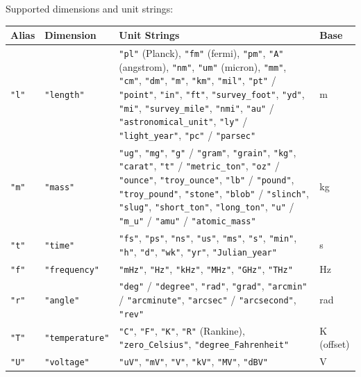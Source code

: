 Supported dimensions and unit strings:

\begin{table}[h]
\centering
\footnotesize
\begin{tabular}{|l|l|p{10cm}|l|}
\hline
\textbf{Alias} & \textbf{Dimension} & \textbf{Unit Strings} & \textbf{Base} \\
\hline
\texttt{"l"} & \texttt{"length"} & \texttt{"pl"} (Planck), \texttt{"fm"} (fermi), \texttt{"pm"}, \texttt{"A"} (angstrom), \texttt{"nm"}, \texttt{"um"} (micron), \texttt{"mm"}, \texttt{"cm"}, \texttt{"dm"}, \texttt{"m"}, \texttt{"km"}, \texttt{"mil"}, \texttt{"pt"} / \texttt{"point"}, \texttt{"in"}, \texttt{"ft"}, \texttt{"survey\_foot"}, \texttt{"yd"}, \texttt{"mi"}, \texttt{"survey\_mile"}, \texttt{"nmi"}, \texttt{"au"} / \texttt{"astronomical\_unit"}, \texttt{"ly"} / \texttt{"light\_year"}, \texttt{"pc"} / \texttt{"parsec"} & m \\
\hline
\texttt{"m"} & \texttt{"mass"} & \texttt{"ug"}, \texttt{"mg"}, \texttt{"g"} / \texttt{"gram"}, \texttt{"grain"}, \texttt{"kg"}, \texttt{"carat"}, \texttt{"t"} / \texttt{"metric\_ton"}, \texttt{"oz"} / \texttt{"ounce"}, \texttt{"troy\_ounce"}, \texttt{"lb"} / \texttt{"pound"}, \texttt{"troy\_pound"}, \texttt{"stone"}, \texttt{"blob"} / \texttt{"slinch"}, \texttt{"slug"}, \texttt{"short\_ton"}, \texttt{"long\_ton"}, \texttt{"u"} / \texttt{"m\_u"} / \texttt{"amu"} / \texttt{"atomic\_mass"} & kg \\
\hline
\texttt{"t"} & \texttt{"time"} & \texttt{"fs"}, \texttt{"ps"}, \texttt{"ns"}, \texttt{"us"}, \texttt{"ms"}, \texttt{"s"}, \texttt{"min"}, \texttt{"h"}, \texttt{"d"}, \texttt{"wk"}, \texttt{"yr"}, \texttt{"Julian\_year"} & s \\
\hline
\texttt{"f"} & \texttt{"frequency"} & \texttt{"mHz"}, \texttt{"Hz"}, \texttt{"kHz"}, \texttt{"MHz"}, \texttt{"GHz"}, \texttt{"THz"} & Hz \\
\hline
\texttt{"r"} & \texttt{"angle"} & \texttt{"deg"} / \texttt{"degree"}, \texttt{"rad"}, \texttt{"grad"}, \texttt{"arcmin"} / \texttt{"arcminute"}, \texttt{"arcsec"} / \texttt{"arcsecond"}, \texttt{"rev"} & rad \\
\hline
\texttt{"T"} & \texttt{"temperature"} & \texttt{"C"}, \texttt{"F"}, \texttt{"K"}, \texttt{"R"} (Rankine), \texttt{"zero\_Celsius"}, \texttt{"degree\_Fahrenheit"} & K (offset) \\
\hline
\texttt{"U"} & \texttt{"voltage"} & \texttt{"uV"}, \texttt{"mV"}, \texttt{"V"}, \texttt{"kV"}, \texttt{"MV"}, \texttt{"dBV"} & V \\

\end{tabular}
\end{table}
